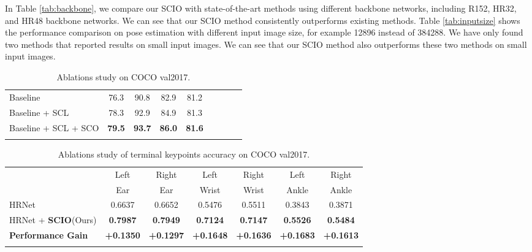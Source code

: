 \documentclass[runningheads]{llncs}
\begin{document}
In Table \ref{tab:backbone}, we compare our SCIO with state-of-the-art methods using different backbone networks, including R152, HR32, and HR48 backbone networks. 
We can see that our SCIO method consistently outperforms existing methods. Table \ref{tab:inputsize} shows the performance comparison on pose estimation with different input image size, for example 12896 instead of 384288. We have only found two methods that reported results on small input images. 
We can see that our SCIO method also outperforms these two methods on small input images. 


\begin{table}[t]
\begin{center}
\caption{Ablations study on COCO val2017.} 
\label{tab:ablations}
\begin{tabular}{l|cccccccc}
\hline\noalign{\smallskip}
  &  &  &     &  \\
\hline\noalign{\smallskip}
Baseline & 76.3  & 90.8  & 82.9    & 81.2\\
Baseline + SCL & 78.3 & 92.9 & 84.9  & 81.3\\
Baseline + SCL + SCO &\textbf{79.5} & \textbf{93.7} & \textbf{86.0} & \textbf{81.6} \\
\hline\noalign{\smallskip}
\end{tabular}
\end{center}
\end{table}


\begin{table}
\begin{center}
\caption{Ablations study of terminal keypoints accuracy on COCO val2017.}
\label{tab:ablations of keypoints}
\begin{tabular}{l|cccccc}
\hline\noalign{\smallskip}
 & Left & Right & Left & Right & Left & Right\\
 & Ear & Ear & Wrist & Wrist & Ankle & Ankle\\
\hline\noalign{\smallskip}
HRNet & 0.6637  & 0.6652  & 0.5476   & 0.5511 & 0.3843 & 0.3871\\
\hline\noalign{\smallskip}
HRNet + \textbf{SCIO}(Ours) &\textbf{0.7987} & \textbf{0.7949} & \textbf{0.7124} & \textbf{0.7147} & \textbf{0.5526} & \textbf{0.5484}\\
\textbf{Performance Gain} & \textbf{+0.1350} & \textbf{+0.1297}  & \textbf{+0.1648} & \textbf{+0.1636}& \textbf{+0.1683} & \textbf{+0.1613}\\
\hline\noalign{\smallskip}
\end{tabular}
\end{center}
\end{table}
\end{document}
